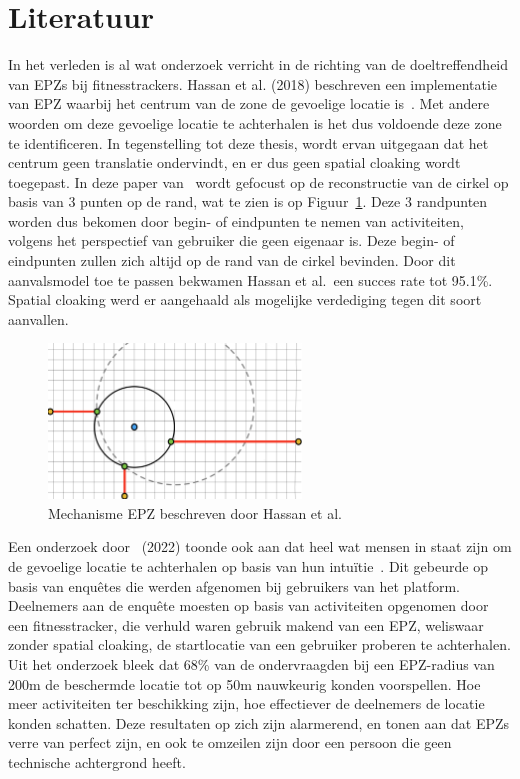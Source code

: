 \section{Literatuur}
In het verleden is al wat onderzoek verricht in de richting van de
doeltreffendheid van \acp{EPZ} bij fitnesstrackers. Hassan et al. (2018)
beschreven een implementatie van EPZ waarbij het centrum van de zone de
gevoelige locatie is~\cite{sec18has3:online}. Met andere woorden om deze
gevoelige locatie te achterhalen is het dus voldoende deze zone te
identificeren. In tegenstelling tot deze thesis, wordt ervan uitgegaan dat het
centrum geen translatie ondervindt, en er dus geen spatial cloaking wordt
toegepast. In deze paper van~\citeauthor{sec18has3:online} wordt gefocust op de
reconstructie van de cirkel op basis van 3 punten op de rand, wat te zien is op
Figuur~\ref{fig:Hassan_EPZ}. Deze 3 randpunten worden dus bekomen door begin-
of eindpunten te nemen van activiteiten, volgens het perspectief van gebruiker
die geen eigenaar is. Deze begin- of eindpunten zullen zich altijd op de rand
van de cirkel bevinden. Door dit aanvalsmodel toe te passen bekwamen Hassan et
al.\ een succes rate tot 95.1\%. Spatial cloaking werd er aangehaald als
mogelijke verdediging tegen dit soort aanvallen.
\begin{figure}[h]
    \centering
    \includegraphics[width=0.6\textwidth]{fig/EPZ-mechanisme/Hassan.png}
    \caption{Mechanisme EPZ beschreven door Hassan et al.~\cite{sec18has3:online}}\label{fig:Hassan_EPZ}
\end{figure}

Een onderzoek door~\citeauthor{10.1145/3491102.3502136} (2022) toonde ook aan
dat heel wat mensen in staat zijn om de gevoelige locatie te achterhalen op
basis van hun intuïtie~\cite{10.1145/3491102.3502136}. Dit gebeurde op basis
van enquêtes die werden afgenomen bij gebruikers van het platform. Deelnemers
aan de enquête moesten op basis van activiteiten opgenomen door een
fitnesstracker, die verhuld waren gebruik makend van een \ac{EPZ}, weliswaar
zonder spatial cloaking, de startlocatie van een gebruiker proberen te
achterhalen. Uit het onderzoek bleek dat 68\% van de ondervraagden bij een
\ac{EPZ}-radius van 200m de beschermde locatie tot op 50m nauwkeurig konden
voorspellen. Hoe meer activiteiten ter beschikking zijn, hoe effectiever de
deelnemers de locatie konden schatten. Deze resultaten op zich zijn alarmerend,
en tonen aan dat \acp{EPZ} verre van perfect zijn, en ook te omzeilen zijn door
een persoon die geen technische achtergrond heeft.

